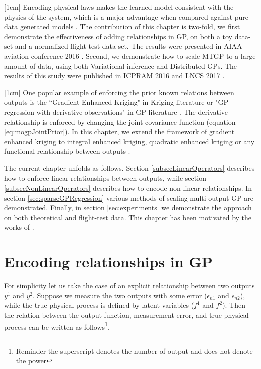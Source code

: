 [1cm]
Encoding physical laws makes the learned model consistent with the physics of the system, which is a major advantage when compared against pure data generated models \cite{jazwinski2007stochastic}. The contribution of this chapter is two-fold, we first demonstrate the effectiveness of adding relationships in GP, on both a toy data-set and a normalized flight-test data-set. The results were presented in AIAA aviation conference 2016 \cite{oatao18001}. Second, we demonstrate how to scale MTGP to a large amount of data, using both Variational inference and Distributed GPs. The results of this study were published in ICPRAM 2016 and LNCS 2017 \cite{icpram16Ankit, oatao18000}.

[1cm]
One popular example of enforcing the prior known relations between outputs is the ``Gradient Enhanced Kriging" in Kriging literature \cite{chung2002using, morris1993bayesian, forrester2009recent} or "GP regression with derivative observations" in GP literature \cite{NIPSDerivativeGP}. The derivative relationship is enforced by changing the joint-covariance function (equation \ref{eq:mogpJointPrior}). In this chapter, we extend the framework of gradient enhanced kriging to integral enhanced kriging, quadratic enhanced kriging or any functional relationship between outputs \cite{Constantinescu2013}.  

The current chapter unfolds as follows. Section \ref{subsecLinearOperators} describes how to enforce linear relationships between outputs, while section \ref{subsecNonLinearOperators} describes how to encode non-linear relationships. In section \ref{sec:sparseGPRegression} various methods of scaling multi-output GP are demonstrated. Finally, in section \ref{sec:experiments} we demonstrate the approach on both theoretical and flight-test data. This chapter has been motivated by the works of \cite{Constantinescu2013, journals/jmlr/AlvarezLL09, sarkka2011linear, jidling2017linearly, ginsbourger2013invariances, sarkka2011linear}.

\section{Encoding relationships in GP}\label{secEncodingRelationships}
For simplicity let us take the case of an explicit relationship between two outputs \(y^{1}\) and \(y^{2}\). Suppose we measure the two outputs with some error ($\epsilon_{n1}$ and $\epsilon_{n2}$), while the true physical process is defined by latent variables (\(f^{1}\) and \(f^{2}\)). Then the relation between the output function, measurement error, and true physical process can be written as follows\footnote{Reminder the superscript denotes the number of output and does not denote the power}. 

